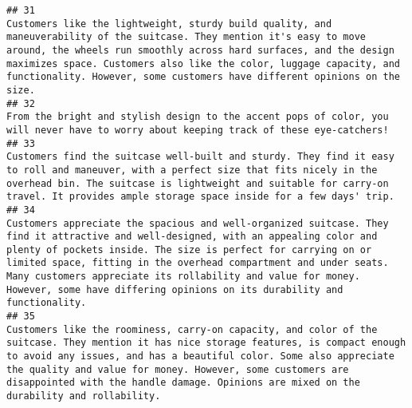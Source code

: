 \documentclass[
]{article}
\begin{document}
\begin{verbatim}
## 31                                                                                                                                                                                                                                                                           Customers like the lightweight, sturdy build quality, and maneuverability of the suitcase. They mention it's easy to move around, the wheels run smoothly across hard surfaces, and the design maximizes space. Customers also like the color, luggage capacity, and functionality. However, some customers have different opinions on the size.
## 32                                                                                                                                                                                                                                                                                                                                                                                                                                                                                  From the bright and stylish design to the accent pops of color, you will never have to worry about keeping track of these eye-catchers!  
## 33                                                                                                                                                                                                                                                                                                                                            Customers find the suitcase well-built and sturdy. They find it easy to roll and maneuver, with a perfect size that fits nicely in the overhead bin. The suitcase is lightweight and suitable for carry-on travel. It provides ample storage space inside for a few days' trip.
## 34                                                                                                                                                                                                       Customers appreciate the spacious and well-organized suitcase. They find it attractive and well-designed, with an appealing color and plenty of pockets inside. The size is perfect for carrying on or limited space, fitting in the overhead compartment and under seats. Many customers appreciate its rollability and value for money. However, some have differing opinions on its durability and functionality.
## 35                                                                                                                                                                                                                                                      Customers like the roominess, carry-on capacity, and color of the suitcase. They mention it has nice storage features, is compact enough to avoid any issues, and has a beautiful color. Some also appreciate the quality and value for money. However, some customers are disappointed with the handle damage. Opinions are mixed on the durability and rollability.

\end{verbatim}
\end{document}
